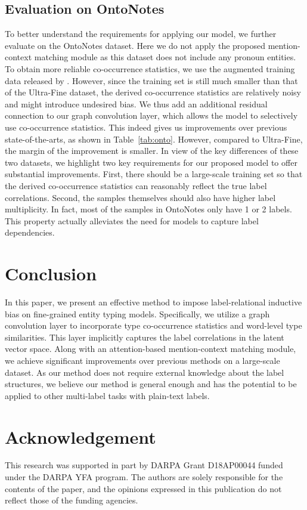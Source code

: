 \documentclass[11pt,a4paper]{article}
\begin{document}
\subsection{Evaluation on OntoNotes}
To better understand the requirements for applying our model, we further evaluate on the OntoNotes dataset. Here we do not apply the proposed mention-context matching module as this dataset does not include any pronoun entities. To obtain more reliable co-occurrence statistics, we use the augmented training data released by \citet{choi2018ultra}. However, since the training set is still much smaller than that of the Ultra-Fine dataset, the derived co-occurrence statistics are relatively noisy and might introduce undesired bias. We thus add an additional residual connection to our graph convolution layer, which allows the model to selectively use co-occurrence statistics. This indeed gives us improvements over previous state-of-the-arts, as shown in Table~\ref{tab:onto}. However, compared to Ultra-Fine, the margin of the improvement is smaller. In view of the key differences of these two datasets, we highlight two key requirements for our proposed model to offer substantial improvements. First, there should be a large-scale training set so that the derived co-occurrence statistics can reasonably reflect the true label correlations. Second, the samples themselves should also have higher label multiplicity. In fact, most of the samples in OntoNotes only have 1 or 2 labels. This property actually alleviates the need for models to capture label dependencies. 

\section{Conclusion}
In this paper, we present an effective method to impose label-relational inductive bias on fine-grained entity typing models. Specifically, we utilize a graph convolution layer to incorporate type co-occurrence statistics and word-level type similarities. This layer implicitly captures the label correlations in the latent vector space. Along with an attention-based mention-context matching module, we achieve significant improvements over previous methods on a large-scale dataset. As our method does not require external knowledge about the label structures, we believe our method is general enough and has the potential to be applied to other multi-label tasks with plain-text labels. 

\section*{Acknowledgement}
This research was supported in part by DARPA Grant D18AP00044 funded under the DARPA YFA program. The authors are solely responsible for the contents of the paper, and the opinions expressed in this publication do not reflect those of the funding agencies.
\end{document}
